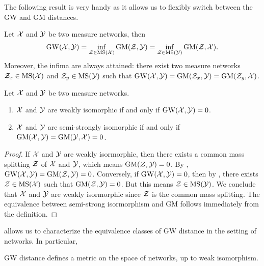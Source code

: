 The following result is very handy as it allows us to flexibly switch between the GW and GM distances.
\begin{corollary}
  \label{GW_mGW}
  Let $\mathcal X$ and $\mathcal Y$ be two measure networks, then
  \begin{align}
    \text{GW}(\mathcal X, \mathcal Y) = \inf_{\mathcal Z \in \text{MS}(\mathcal X)} \text{GM}(\mathcal Z, \mathcal Y)
    = \inf_{\mathcal Z \in \text{MS}(\mathcal Y)} \text{GM}(\mathcal Z, \mathcal X).
  \end{align}
  Moreover, the infima are always attained: there exist two measure networks $\mathcal Z_x \in \text{MS}(\mathcal X)$ and
  $\mathcal Z_y \in \text{MS}(\mathcal Y)$ such that
  $\text{GW}(\mathcal X, \mathcal Y) = \text{GM}(\mathcal Z_x, \mathcal Y) = \text{GM}(\mathcal Z_y, \mathcal X)$.
\end{corollary}
\begin{proposition} \label{prop:GW_iso}
  Let $\mathcal X$ and $\mathcal Y$ be two measure networks.
  \begin{enumerate}
    \item $\mathcal X$ and $\mathcal Y$ are weakly isomorphic if and only if $\text{GW}(\mathcal X, \mathcal Y) = 0$.
    \item $\mathcal X$ and $\mathcal Y$ are semi-strongly isomorphic if and only if
    $\text{GM}(\mathcal X, \mathcal Y) = \text{GM}(\mathcal Y, \mathcal X) = 0$.
  \end{enumerate}
\end{proposition}
\begin{proof}
If $\mathcal X$ and $\mathcal Y$ are weakly isormorphic, then there exists a common mass splitting
$\mathcal Z$ of $\mathcal X$ and $\mathcal Y$, which means $\text{GM}(\mathcal Z, \mathcal Y) = 0$. By ,
$\text{GW}(\mathcal X, \mathcal Y) = \text{GM}(\mathcal Z, \mathcal Y) = 0$. Conversely, if $\text{GW}(\mathcal X, \mathcal Y) = 0$,
then by , there exists $\mathcal Z \in \text{MS}(\mathcal X)$ such that $\text{GM}(\mathcal Z, \mathcal Y) = 0$.
But this means $\mathcal Z \in \text{MS}(\mathcal Y)$. We conclude that $\mathcal X$ and $\mathcal Y$ are weakly isormorphic
since $\mathcal Z$ is the common mass splitting. The equivalence between semi-strong isormorphism and
GM follows immediately from the definition.
\end{proof}
 allows us to characterize the equivalence classes of GW distance in the
setting of networks. In particular,
\begin{proposition}
  GW distance defines a metric on the space of networks, up to weak isomorphism.
\end{proposition}

